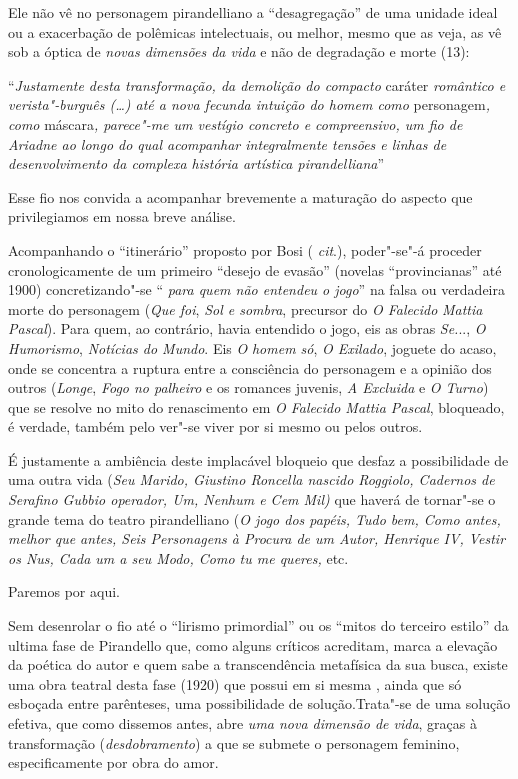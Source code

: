 Ele não vê no personagem pirandelliano a ``desagregação'' de uma unidade
ideal ou a exacerbação de polêmicas intelectuais, ou melhor, mesmo que
as veja, as vê sob a óptica de \emph{novas dimensões da vida} e não de
degradação e morte (13):

``\emph{Justamente desta transformação, da demolição do compacto}
caráter \emph{romântico e verista"-burguês (\ldots{}) até a nova fecunda
intuição do homem como} personagem\emph{, como} máscara\emph{, parece"-me
um vestígio concreto e compreensivo, um fio de Ariadne ao longo do qual
acompanhar integralmente tensões e linhas de desenvolvimento da complexa
história artística pirandelliana}''

Esse fio nos convida a acompanhar brevemente a maturação do aspecto que
privilegiamos em nossa breve análise.

Acompanhando o ``itinerário'' proposto por Bosi ( \emph{cit}.),
poder"-se"-á proceder cronologicamente de um primeiro ``desejo de evasão''
(novelas ``provincianas'' até 1900) concretizando"-se `` \emph{para quem
não entendeu o jogo}'' na falsa ou verdadeira morte do personagem
(\emph{Que foi}, \emph{Sol e sombra}, precursor do \emph{O Falecido}
\emph{Mattia Pascal}). Para quem, ao contrário, havia entendido o jogo,
eis as obras \emph{Se.}.., \emph{O Humorismo}, \emph{Notícias do Mundo}.
Eis \emph{O} \emph{homem só}, \emph{O Exilado}, joguete do acaso, onde
se concentra a ruptura entre a consciência do personagem e a opinião dos
outros (\emph{Longe}, \emph{Fogo no palheiro} e os romances juvenis,
\emph{A Excluida} e \emph{O Turno}) que se resolve no mito do
renascimento em \emph{O Falecido Mattia Pascal}, bloqueado, é verdade,
também pelo ver"-se viver por si mesmo ou pelos outros.

É justamente a ambiência deste implacável bloqueio que desfaz a
possibilidade de uma outra vida (\emph{Seu Marido, Giustino Roncella
nascido Roggiolo, Cadernos de Serafino Gubbio operador, Um, Nenhum e Cem
Mil)} que haverá de tornar"-se o grande tema do teatro pirandelliano
(\emph{O jogo dos papéis, Tudo bem, Como antes, melhor que antes, Seis
Personagens à Procura de um Autor, Henrique IV, Vestir os Nus, Cada um a
seu Modo, Como tu me queres,} etc.

Paremos por aqui.

Sem desenrolar o fio até o ``lirismo primordial'' ou os ``mitos do
terceiro estilo'' da ultima fase de Pirandello que, como alguns críticos
acreditam, marca a elevação da poética do autor e quem sabe a
transcendência metafísica da sua busca, existe uma obra teatral desta
fase (1920) que possui em si mesma , ainda que só esboçada entre
parênteses, uma possibilidade de solução.Trata"-se de uma solução
efetiva, que como dissemos antes, abre \emph{uma nova dimensão de vida},
graças à transformação (\emph{desdobramento}) a que se submete o
personagem feminino, especificamente por obra do amor.

